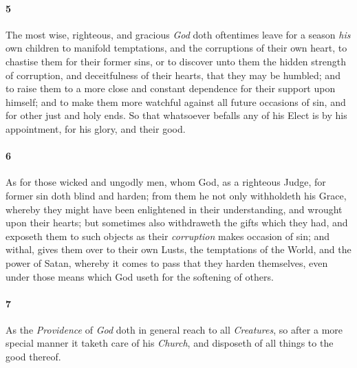 \documentclass[
    paper=letterpaper,
    11pt,
    twoside,
    DIV=calc,
    openany
]{scrbook}
\newcommand{\ERRATA}[1]{}
\begin{document}
\footnotebegin
{}
\footnoteend

\paragraph{5} %
The most wise, righteous, and gracious \textit{God} doth oftentimes leave for a season \textit{his} own children to manifold temptations, and the corruptions of their own heart, to chastise them for their former sins, or to discover unto them the hidden strength of corruption, and deceitfulness of their hearts, \R{}that they may be humbled; and to raise them to a more close and constant dependence for their support upon himself; and to make them more watchful against all future occasions of sin, and for other just and holy ends. 
So that whatsoever befalls any of his Elect is by his appointment, for his glory, \R{}and their good.

\footnotebegin
\ERRATA{
1688 & 1719 have 2 Samuel 24:1
lbcw & Reni drop 2 Samuel 24:1
}
\footnoteend

\paragraph{6} %
As for those wicked and ungodly men, whom God, as a righteous Judge, for former sin doth \R{}blind and harden; from them he not only withholdeth his \R{}Grace, whereby they might have been enlightened in their understanding, and wrought upon their hearts; but sometimes also withdraweth \R{}the gifts which they had, and exposeth them to such \R{}objects as their \textit{corruption} makes occasion of sin; and withal, \R{}gives them over to their own Lusts, the temptations of the World, and the power of Satan, whereby it comes to pass that they \R{}harden themselves, even under those means which God useth for the softening of others.

\footnotebegin
\ERRATA{
1688: Romans 1:24,26,28
1719: Romans 1:24,25,28
lbcw: Romans 1:24-26,28
}
\footnoteend

\paragraph{7} %
As the \textit{Providence} of \textit{God} doth in general reach to all \textit{Creatures}, so after a more special manner it taketh care of his \R{}\textit{Church}, and disposeth of all things to the good thereof.
\end{document}
